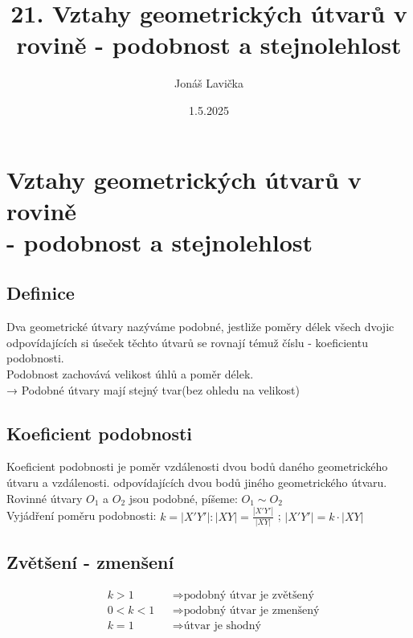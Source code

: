 \title{21. Vztahy geometrických útvarů v rovině - podobnost a stejnolehlost}
\author{Jonáš Lavička}
\date{1.5.2025}

\maketitle

\section{Vztahy geometrických útvarů v rovině\\- podobnost a stejnolehlost}
    \subsection{Definice}
        Dva geometrické útvary nazýváme podobné, jestliže poměry délek všech dvojic odpovídajících si úseček těchto útvarů se rovnají témuž číslu - koeficientu podobnosti.\\
        Podobnost zachovává velikost úhlů a poměr délek.\\
        → Podobné útvary mají stejný tvar(bez ohledu na velikost)
        
    \subsection{Koeficient podobnosti}
        Koeficient podobnosti je poměr vzdálenosti dvou bodů daného geometrického útvaru a vzdálenosti. odpovídajících dvou bodů jiného geometrického útvaru.\\
        Rovinné útvary $O_{1}$ a $O_{2}$ jsou podobné, píšeme:  $O_{1} \sim O_{2}$\\
        Vyjádření poměru podobnosti: $k = \left| X'Y' \right|:\left| XY \right| = \frac{\left| X'Y' \right|}{\left| XY \right|}$ ; $\left| X'Y' \right| = k \cdot \left| XY \right|$

    \subsection{Zvětšení - zmenšení}
        \begin{align*}
            & k>1   && \Rightarrow \text{podobný útvar je zvětšený}\\
            & 0<k<1 && \Rightarrow \text{podobný útvar je zmenšený}\\
            & k=1   && \Rightarrow \text{útvar je shodný}
        \end{align*}

